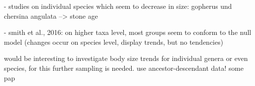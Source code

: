 - studies on individual species which seem to decrease in size: gopherus und chersina angulata --> stone age

- smith et al., 2016: on higher taxa level, most groups seem to conform to the null model (changes occur on species level, display trends, but no tendencies)


would be interesting to investigate body size trends for individual genera or even species, for this further sampling is needed. use ancestor-descendant data! 
some pap
